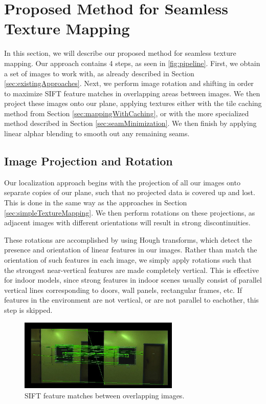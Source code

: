 \documentclass[10pt,twocolumn,letterpaper]{article}
\begin{document}
\section{Proposed Method for Seamless Texture Mapping}
\label{sec:proposedApproach}
In this section, we will describe our proposed method for seamless
texture mapping. Our approach contains 4 steps, as seen in
\ref{fig:pipeline}.  First, we obtain a set of images to work with, as
already described in Section \ref{sec:existingApproaches}. Next, we perform
image rotation and shifting in order to maximize SIFT feature matches
in overlapping areas between images. We then project these images onto
our plane, applying textures either with the tile caching method from
Section \ref{sec:mappingWithCaching}, or with the more specialized
method described in Section \ref{sec:seamMinimization}. We then finish
by applying linear alphar blending to smooth out any remaining seams.

\subsection{Image Projection and Rotation}
\label{sec:projectionAndRotation}
Our localization approach begins with the projection of all our images
onto separate copies of our plane, such that no projected data is
covered up and lost. This is done in the same way as the approaches in
Section \ref{sec:simpleTextureMapping}. We then perform rotations on
these projections, as adjacent images with different orientations will
result in strong discontinuities.

These rotations are accomplished by using Hough transforms, which
detect the presence and orientation of linear features in our
images. Rather than match the orientation of such features in each
image, we simply apply rotations such that the strongest near-vertical
features are made completely vertical. This is effective for indoor
models, since strong features in indoor scenes usually consist of
parallel vertical lines corresponding to doors, wall panels,
rectangular frames, etc. If features in the environment are not
vertical, or are not parallel to eachother, this step is skipped.


\begin{figure}
  \centering
  \includegraphics[width=3in]{matches.jpg}
  \caption{SIFT feature matches between overlapping images.}
  \label{fig:matches}
\end{figure}
\end{document}
